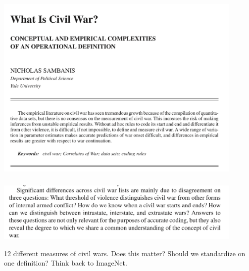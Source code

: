 \documentclass[aspectratio=169]{beamer}
\begin{document}
\begin{frame}
\frametitle{}

\begin{center}
\includegraphics[width=0.9\textwidth]{figures/sambanis_what_2004_title}
\end{center}

\end{frame}
\begin{frame}
\frametitle{}

\begin{center}
\includegraphics[width=0.9\textwidth]{figures/sambanis_what_2004_para}
\end{center}

12 different measures of civil wars. Does this matter? Should we standardize on one definition? Think back to ImageNet.

\end{frame}
\end{document}
